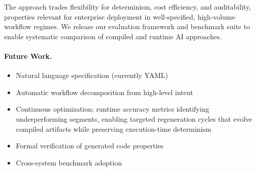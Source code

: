 \documentclass[11pt]{article}
\begin{document}
The approach trades flexibility for determinism, cost efficiency, and auditability, properties relevant for enterprise deployment in well-specified, high-volume workflow regimes. We release our evaluation framework and benchmark suite to enable systematic comparison of compiled and runtime AI approaches.

\paragraph{Future Work.}
\begin{itemize}
    \item Natural language specification (currently YAML)
    \item Automatic workflow decomposition from high-level intent
    \item Continuous optimization: runtime accuracy metrics identifying underperforming segments, enabling targeted regeneration cycles that evolve compiled artifacts while preserving execution-time determinism
    \item Formal verification of generated code properties
    \item Cross-system benchmark adoption
\end{itemize}



\end{document}
